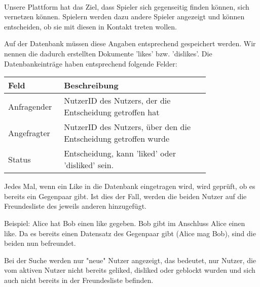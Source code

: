 \paragraph{}
Unsere Plattform hat das Ziel, dass Spieler sich gegenseitig finden können, sich vernetzen können. Spielern werden dazu andere Spieler angezeigt und können entscheiden, ob sie mit diesen in Kontakt treten wollen. 

Auf der Datenbank müssen diese Angaben entsprechend gespeichert werden. Wir nennen die dadurch erstellten Dokumente 'likes' bzw. 'dislikes'. Die Datenbankeinträge haben entsprechend folgende Felder:

\begin{center}
    \begin{tabular}{ |p{0.15\linewidth}|p{0.64\linewidth}| } 
     \hline
     Feld & Beschreibung \\ 
     \hline
     Anfragender & NutzerID des Nutzers, der die Entscheidung getroffen hat \\
     Angefragter & NutzerID des Nutzers, über den die Entscheidung getroffen wurde \\
     Status & Entscheidung, kann 'liked' oder 'disliked' sein. \\
     \hline
    \end{tabular}
\end{center}

Jedes Mal, wenn ein Like in die Datenbank eingetragen wird, wird geprüft, ob es bereits ein Gegenpaar gibt. Ist dies der Fall, werden die beiden Nutzer auf die Freundesliste des jeweils anderen hinzugefügt.

Beispiel: Alice hat Bob einen like gegeben. Bob gibt im Anschluss Alice einen like. Da es bereits einen Datensatz des Gegenpaar gibt (Alice mag Bob), sind die beiden nun befreundet.


Bei der Suche werden nur "neue" Nutzer angezeigt, das bedeutet, nur Nutzer, die vom aktiven Nutzer nicht bereits geliked, disliked oder geblockt wurden und sich auch nicht bereits in der Freundesliste befinden.